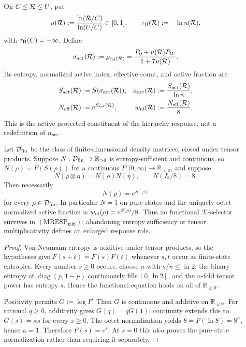 \documentclass[12pt,a4paper]{article}
\begin{document}
\begin{definition}
\label{p3:def:normalized-reduced-shell-length}
On \(C\le\mathcal R\le U\), put
\begin{equation}
\label{p3:eq:active-log-visibility}
 u(\mathcal R)
 :=\frac{\ln(\mathcal R/C)}{\ln(U/C)}\in[0,1],
 \qquad
 \tau_{\rm H}(\mathcal R):=-\ln u(\mathcal R),
\end{equation}
with \(\tau_{\rm H}(C)=+\infty\).  Define
\begin{equation}
\label{p3:eq:hierarchy-active-state}
 \sigma_{\rm act}(\mathcal R)
 :=\rho_{\tau_{\rm H}(\mathcal R)}
 =\frac{P_0+u(\mathcal R)P_W}{1+7u(\mathcal R)}.
\end{equation}
Its entropy, normalized active index, effective count, and active fraction are
\[
\begin{aligned}
 S_{\rm act}(\mathcal R)&:=S(\sigma_{\rm act}(\mathcal R)),
 &n_{\rm act}(\mathcal R)&:=\frac{S_{\rm act}(\mathcal R)}{\ln8},\\
 N_{\rm eff}(\mathcal R)&:=e^{S_{\rm act}(\mathcal R)},
 &w_{\rm nl}(\mathcal R)&:=\frac{N_{\rm eff}(\mathcal R)}8.
\end{aligned}
\]
This is the active protected constituent of the hierarchy response, not a
redefinition of \(n_{\rm sec}\).
\end{definition}

\begin{theorem}
\label{p3e:thm:entropy-effective-count-uniqueness}
Let \(\mathcal D_{\rm fin}\) be the class of finite-dimensional density
matrices, closed under tensor products.  Suppose
\(N:\mathcal D_{\rm fin}\to\mathbb R_{>0}\) is entropy-sufficient and
continuous, so \(N(\rho)=F(S(\rho))\) for a continuous
\(F:[0,\infty)\to\mathbb R_{>0}\), and suppose
\[
 N(\rho\otimes\eta)=N(\rho)N(\eta),
 \qquad N(I_8/8)=8.
\]
Then necessarily
\[
 \boxed{N(\rho)=e^{S(\rho)}}
\]
for every \(\rho\in\mathcal D_{\rm fin}\).  In particular \(N=1\) on pure
states and the uniquely octet-normalized active fraction is
\(w_{\rm nl}(\rho)=e^{S(\rho)}/8\).  Thus no functional
\(\mathcal K\)-selector survives in
\((\mathrm{MRESP}_{\min})\); abandoning entropy sufficiency or tensor
multiplicativity defines an enlarged response role.
\end{theorem}

\begin{proof}
Von Neumann entropy is additive under tensor products, so the hypotheses give
\(F(s+t)=F(s)F(t)\) whenever \(s,t\) occur as finite-state entropies.  Every
number \(s\ge0\) occurs: choose \(n\) with \(s/n\le\ln2\); the binary entropy
of \(\operatorname{diag}(p,1-p)\) continuously fills \([0,\ln2]\), and the
\(n\)-fold tensor power has entropy \(s\).  Hence the functional equation
holds on all of \(\mathbb R_{\ge0}\).

Positivity permits \(G:=\log F\).  Then \(G\) is continuous and additive on
\(\mathbb R_{\ge0}\).  For rational \(q\ge0\), additivity gives
\(G(q)=qG(1)\); continuity extends this to
\(G(s)=\kappa s\) for every \(s\ge0\).  The octet normalization yields
\(8=F(\ln8)=8^\kappa\), hence \(\kappa=1\).  Therefore \(F(s)=e^s\).
At \(s=0\) this also proves the pure-state normalization rather than requiring
it separately.
\end{proof}
\end{document}
